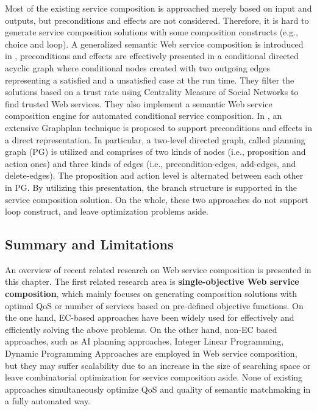 Most of the existing service composition is approached merely based on input and outputs, but preconditions and effects are not considered. Therefore, it is hard to generate service composition solutions with some composition constructs (e.g., choice and loop). A generalized semantic Web service composition is introduced in \cite{bansal2016generalized}, preconditions and effects are effectively presented in a conditional directed acyclic graph where conditional nodes created with two outgoing edges representing a satisfied and a unsatisfied case at the run time. They filter the solutions based on a trust rate using Centrality Measure of Social Networks to find trusted Web services. They also implement a semantic Web service composition engine for automated conditional service composition. In \cite{wang2016automatic}, an extensive Graphplan technique is proposed to support preconditions and effects in a direct representation. In particular, a two-level directed graph, called planning graph (PG) is utilized and comprises of two kinds of nodes (i.e., proposition and action ones) and three kinds of edges (i.e., precondition-edges, add-edges, and delete-edges). The proposition and action level is alternated between each other in PG. By utilizing this presentation, the branch structure is supported in the service composition solution. On the whole, these two approaches do not support loop construct, and leave optimization problems aside.


\subsection{Summary and Limitations}\label{summary}

An overview of recent related research on Web service composition is presented in this chapter. The first related research area is \textbf{single-objective Web service composition}, which mainly focuses on generating composition solutions with optimal QoS or number of services based on pre-defined objective functions. On the one hand, EC-based approaches have been widely used for effectively and efficiently solving the above problems. On the other hand, non-EC based approaches, such as AI planning approaches, Integer Linear Programming, Dynamic Programming Approaches are employed in Web service composition, but they may suffer scalability due to an increase in the size of searching space or leave combinatorial optimization for service composition aside. None of existing approaches simultaneously optimize QoS and quality of semantic matchmaking in a fully automated way.

